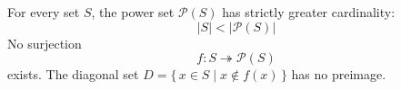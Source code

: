 \documentclass[aspectratio=169]{beamer}
\begin{document}
\begin{wallpaperframe}
For every set \(S\), the power set \(\mathcal{P}(S)\) has strictly greater cardinality:
\[
|S| < |\mathcal{P}(S)|
\]
No surjection
\[
f : S \twoheadrightarrow \mathcal{P}(S)
\]
exists. The diagonal set \(D = \{\, x \in S \mid x \notin f(x) \,\}\) has no preimage.
\end{wallpaperframe}
\end{document}
